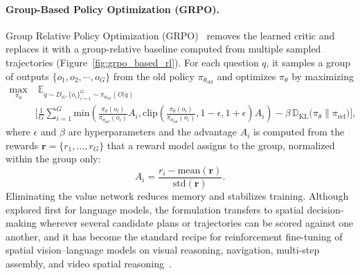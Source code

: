 \paragraph{Group-Based Policy Optimization (GRPO).}
Group Relative Policy Optimization (GRPO)~\cite{guo2025deepseekr1} removes the learned critic and replaces it with a group-relative baseline computed from multiple sampled trajectories (Figure~\ref{fig:grpo_based_rl}).
For each question $q$, it samples a group of outputs $\{o_1, o_2, \cdots, o_G\}$ from the old policy $\pi_{\theta_{\text{old}}}$ and optimizes $\pi_\theta$ by maximizing
\begin{equation}
\begin{split}
     \max_{\pi_\theta} &\;
    \mathbb{E}_{q \sim D_{\text{rl}}, \{o_i\}_{i=1}^{G} \sim \pi_{\theta_{\text{old}}}(O|q)}  \\
    & \Bigg[ \frac{1}{G}
        \sum_{i=1}^G
        \text{min}(\frac{\pi_\theta(o_i)}{\pi_{\theta_{\text{old}}}(o_i)} A_i, \text{clip}(\frac{\pi_\theta(o_i)}{\pi_{\theta_{\text{old}}}(o_i)}, 1-\epsilon, 1+\epsilon) A_i )
        - \beta \, \mathbb{D}_{\mathrm{KL}}\big(\pi_\theta \| \pi_{\mathrm{ref}}\big)
    \Bigg],
\end{split}
\end{equation}
where $\epsilon$ and $\beta$ are hyperparameters and the advantage $A_i$ is computed from the rewards $\mathbf{r}=\{r_1,\dots,r_G\}$ that a reward model assigns to the group, normalized within the group only:
\begin{equation}
    A_i = \frac{r_i - \text{mean}(\mathbf{r})}{\text{std}(\mathbf{r})}.
\end{equation}
Eliminating the value network reduces memory and stabilizes training.
Although explored first for language models, the formulation transfers to spatial decision-making wherever several candidate plans or trajectories can be scored against one another, and it has become the standard recipe for reinforcement fine-tuning of spatial vision--language models on visual reasoning, navigation, multi-step assembly, and video spatial reasoning~\cite{tan2025reasonrft,gao2026octonav,tang2025legoPuzzles,ouyang2025spacer}.


